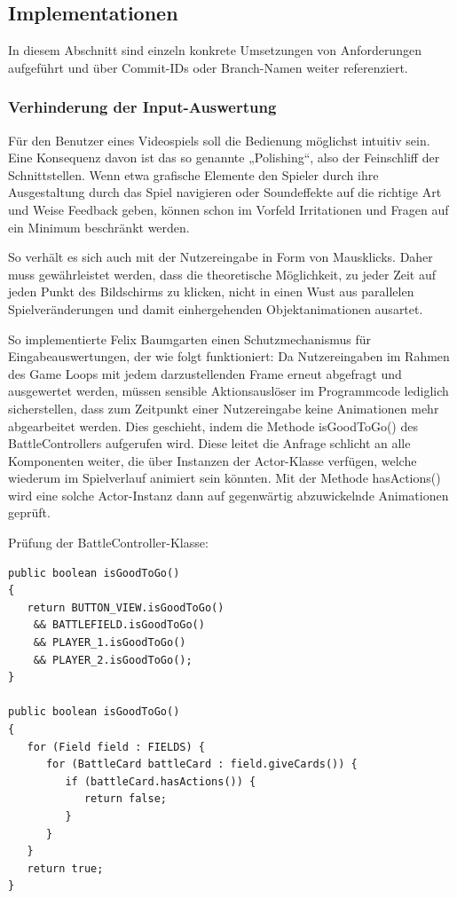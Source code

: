 \subsection{Implementationen}
In diesem Abschnitt sind einzeln konkrete Umsetzungen von Anforderungen aufgeführt und über Commit-IDs oder Branch-Namen weiter referenziert.

\subsubsection{Verhinderung der Input-Auswertung}
Für den Benutzer eines Videospiels soll die Bedienung möglichst intuitiv sein. Eine Konsequenz davon ist das so genannte „Polishing“, also der Feinschliff der Schnittstellen. Wenn etwa grafische Elemente den Spieler durch ihre Ausgestaltung durch das Spiel navigieren oder Soundeffekte auf die richtige Art und Weise Feedback geben, können schon im Vorfeld Irritationen und Fragen auf ein Minimum beschränkt werden.

So verhält es sich auch mit der Nutzereingabe in Form von Mausklicks. Daher muss gewährleistet werden, dass die theoretische Möglichkeit, zu jeder Zeit auf jeden Punkt des Bildschirms zu klicken, nicht in einen Wust aus parallelen Spielveränderungen und damit einhergehenden Objektanimationen ausartet.

So implementierte Felix Baumgarten einen Schutzmechanismus für Eingabeauswertungen, der wie folgt funktioniert: Da Nutzereingaben im Rahmen des Game Loops mit jedem darzustellenden Frame erneut abgefragt und ausgewertet werden, müssen sensible Aktionsauslöser im Programmcode lediglich sicherstellen, dass zum Zeitpunkt einer Nutzereingabe keine Animationen mehr abgearbeitet werden. Dies geschieht, indem die Methode isGoodToGo() des BattleControllers aufgerufen wird. Diese leitet die Anfrage schlicht an alle Komponenten weiter, die über Instanzen der Actor-Klasse verfügen, welche wiederum im Spielverlauf animiert sein könnten. Mit der Methode hasActions() wird eine solche Actor-Instanz dann auf gegenwärtig abzuwickelnde Animationen geprüft.

Prüfung der BattleController-Klasse:
 
\begin{lstlisting}
public boolean isGoodToGo()
{
   return BUTTON_VIEW.isGoodToGo() 
	&& BATTLEFIELD.isGoodToGo() 
	&& PLAYER_1.isGoodToGo() 
	&& PLAYER_2.isGoodToGo();
}

public boolean isGoodToGo()
{
   for (Field field : FIELDS) {
      for (BattleCard battleCard : field.giveCards()) {
         if (battleCard.hasActions()) {
            return false;
         }
      }
   }
   return true;
}
\end{lstlisting}

